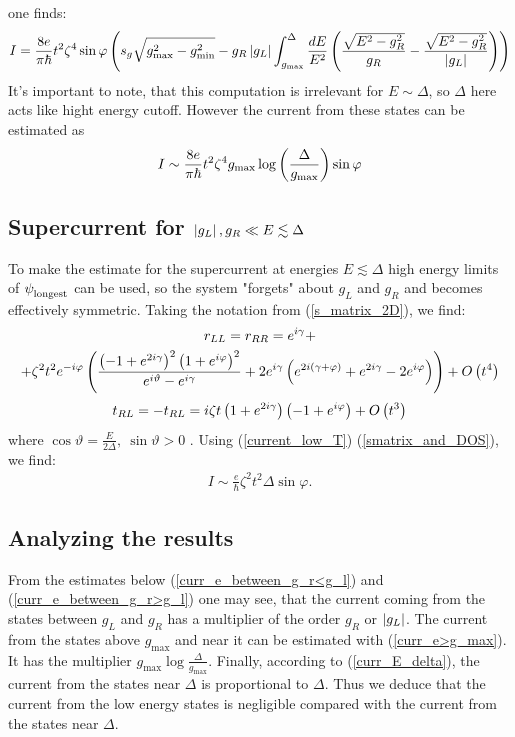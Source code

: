 one finds:
\begin{multline}
I
=
	\frac{8e}{\pi\hbar}t^2\zeta^4
	\sin \varphi
	\left(
	s_g\sqrt{g_{\mathrm{max}}^2-g_{\mathrm{min}}^2}
-
g_{R}\left|g_{L}\right|
\int_{g_{\mathrm{\mathrm{max}}}}^{\Delta}
\frac{dE}{E^2}
\left(
	\frac{\sqrt{E^2-g_{R}^2}}{g_{R}}
	-
	\frac{\sqrt{E^2-g_{R}^2}}{\left|g_{L}\right|}
\right)
	\right)
\end{multline}
It's important to note, that this computation is irrelevant for $ E\sim\Delta $, so $ \Delta $ here acts like hight energy cutoff. However the current from these states can be estimated as
\begin{gather}
\label{curr_e>g_max}
	I
	\sim
	\frac{8e}{\pi\hbar}t^2\zeta^4
	g_\mathrm{max}
	\log\left( \frac{\Delta}{g_\mathrm{max}}\right)
	\sin \varphi
\end{gather} 

\subsection{Supercurrent for $\left|g_L\right|, g_R\ll E \lesssim \Delta $}

\label{subsec:supercurrent_sim_Delta}

To make the estimate for the supercurrent at energies $ E\lesssim \Delta$ high energy limits of $ \psi_{\mathrm{longest}}^{\mathrm{}} $ can be used, so the system "forgets" about $ g_L $ and $ g_R $ and becomes effectively symmetric. Taking the notation from (\ref{s_matrix_2D}), we find:
\begin{multline}
	r_{LL}=r_{RR}
	=
	e^{i \gamma }+
	\\
	+
	\zeta ^2 t^2 e^{-i \varphi } \left(\frac{\left(-1+e^{2 i \gamma }\right)^2 \left(1+e^{i \varphi }\right)^2}{e^{i \vartheta }-e^{i \gamma }}+2 e^{i \gamma } \left(e^{2 i (\gamma +\varphi )}+e^{2 i \gamma }-2 e^{i \varphi }\right)\right)
	+O\left(t^4\right)
	\end{multline}
\begin{gather}
	t_{RL}=-t_{RL}
	=
	i \zeta  t\left(1+e^{2 i \gamma }\right)  \left(-1+e^{i \varphi }\right)
	+
	O\left(t^3 	\right)
\end{gather}
where $\cos\vartheta =\frac{E}{2\Delta},~ \sin\vartheta>0$ .
Using (\ref{current_low_T}) (\ref{smatrix_and_DOS}), we find:
\begin{gather}
\label{curr_E_delta}
I
\sim
	\frac{e}{\hbar}
	\zeta ^2 t^2\Delta
	\sin\varphi.
\end{gather}

\subsection{Analyzing the results}
From the estimates below 	(\ref{curr_e_between_g_r<g_l}) and (\ref{curr_e_between_g_r>g_l}) one may see, that the current coming from the states between $ g_L $ and $ g_R $ has a multiplier of the order $ g_{R} $ or $ \left|g_L\right| $. The current from the states above $ g_{\max} $ and near it can be estimated with (\ref{curr_e>g_max}). It has the multiplier $ g_{\mathrm{max}}\log\frac{\Delta}{g_{\mathrm{max}}} $. Finally, according to (\ref{curr_E_delta}), the current from the states near $ \Delta $ is proportional to $ \Delta $. Thus we deduce that the current from the low energy states is negligible compared with the current from the states near $ \Delta. $ 


